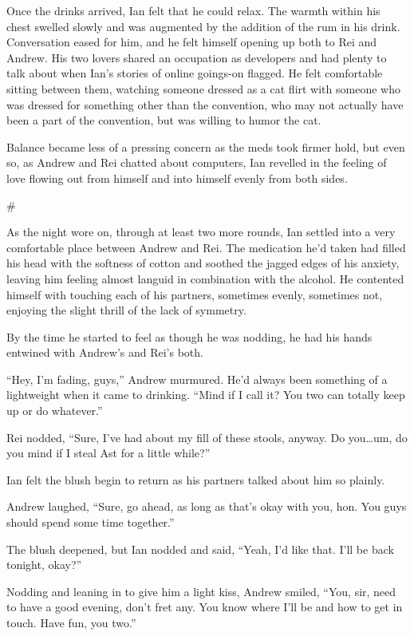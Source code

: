 \documentclass[12pt,letterpaper,oneside]{memoir}
\newcommand\secdiv{
  \begin{center}
    \#
  \end{center}
}
\begin{document}
  Once the drinks arrived, Ian felt that he could relax. The warmth within his chest swelled slowly and was augmented by the addition of the rum in his drink. Conversation eased for him, and he felt himself opening up both to Rei and Andrew. His two lovers shared an occupation as developers and had plenty to talk about when Ian's stories of online goings-on flagged. He felt comfortable sitting between them, watching someone dressed as a cat flirt with someone who was dressed for something other than the convention, who may not actually have been a part of the convention, but was willing to humor the cat.

  Balance became less of a pressing concern as the meds took firmer hold, but even so, as Andrew and Rei chatted about computers, Ian revelled in the feeling of love flowing out from himself and into himself evenly from both sides.

  \secdiv

  As the night wore on, through at least two more rounds, Ian settled into a very comfortable place between Andrew and Rei. The medication he'd taken had filled his head with the softness of cotton and soothed the jagged edges of his anxiety, leaving him feeling almost languid in combination with the alcohol. He contented himself with touching each of his partners, sometimes evenly, sometimes not, enjoying the slight thrill of the lack of symmetry.

  By the time he started to feel as though he was nodding, he had his hands entwined with Andrew's and Rei's both.

  ``Hey, I'm fading, guys,'' Andrew murmured. He'd always been something of a lightweight when it came to drinking. ``Mind if I call it? You two can totally keep up or do whatever.''

  Rei nodded, ``Sure, I've had about my fill of these stools, anyway. Do you\ldots{}um, do you mind if I steal Ast for a little while?''

  Ian felt the blush begin to return as his partners talked about him so plainly.

  Andrew laughed, ``Sure, go ahead, as long as that's okay with you, hon. You guys should spend some time together.''

  The blush deepened, but Ian nodded and said, ``Yeah, I'd like that. I'll be back tonight, okay?''

  Nodding and leaning in to give him a light kiss, Andrew smiled, ``You, sir, need to have a good evening, don't fret any. You know where I'll be and how to get in touch. Have fun, you two.''
\end{document}
